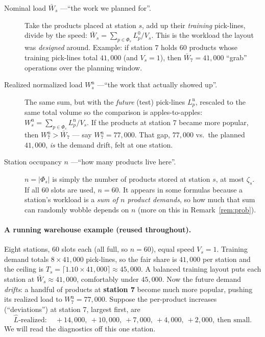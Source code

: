 \documentclass[11pt]{article}
\theoremstyle{definition}
\theoremstyle{plain}
\theoremstyle{remark}
\newcommand{\Lnom}{L^{0}}   %
\newcommand{\Lhat}{\hat{L}} %
\begin{document}
\begin{description}
  \item[\quad Nominal load $\bar W_s$ ---``the work we planned for''.]
  Take the products placed at station $s$, add up their \emph{training}
  pick-lines, divide by the speed: $\bar W_s = \sum_{p\in\Phi_s}\Lnom_p/V_s$.
  This is the workload the layout was \emph{designed} around. Example: if station
  $7$ holds $60$ products whose training pick-lines total $41{,}000$ (and
  $V_s=1$), then $\bar W_7 = 41{,}000$ ``grab'' operations over the planning
  window.

  \item[\quad Realized normalized load $W^{\mathrm n}_s$ ---``the work that
  actually showed up''.] The same sum, but with the \emph{future} (test)
  pick-lines $L^{\mathrm n}_p$, rescaled to the same total volume so the
  comparison is apples-to-apples: $W^{\mathrm n}_s=\sum_{p\in\Phi_s}L^{\mathrm
  n}_p/V_s$. If the products at station $7$ became more popular, then
  $W^{\mathrm n}_7 > \bar W_7$ --- say $W^{\mathrm n}_7 = 77{,}000$. That gap,
  $77{,}000$ vs.\ the planned $41{,}000$, \emph{is} the demand drift, felt at one
  station.

  \item[\quad Station occupancy $n$ ---``how many products live here''.]
  $n=|\Phi_s|$ is simply the number of products stored at station $s$, at most
  $\zeta_s$. If all $60$ slots are used, $n=60$. It appears in some formulas
  because a station's workload is a \emph{sum of $n$ product demands}, so how much
  that sum can randomly wobble depends on $n$ (more on this in
  Remark~\ref{rem:prob}).
\end{description}

\paragraph{A running warehouse example (reused throughout).}
Eight stations, $60$ slots each (all full, so $n=60$), equal speed $V_s=1$.
Training demand totals $8\times 41{,}000$ pick-lines, so the fair share is
$41{,}000$ per station and the ceiling is $T_s=\lceil 1.10\times
41{,}000\rceil\approx 45{,}000$. A balanced training layout puts each station at
$\bar W_s\approx 41{,}000$, comfortably under $45{,}000$. Now the future demand
\emph{drifts}: a handful of products at \textbf{station 7} become much more
popular, pushing its realized load to $W^{\mathrm n}_7 = 77{,}000$. Suppose the
per-product increases (``deviations'') at station 7, largest first, are
\[
\Lhat\text{-realized}: \quad +14{,}000,\ +10{,}000,\ +7{,}000,\ +4{,}000,\ +2{,}000,\ \text{then small}.
\]
We will read the diagnostics off this one station.
\end{document}
